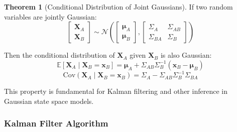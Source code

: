 \documentclass[12pt,a4paper]{article}
\theoremstyle{definition}
\newtheorem{theorem}{Theorem}[section]
\begin{document}
\begin{theorem}[Conditional Distribution of Joint Gaussians]
If two random variables are jointly Gaussian:
\[
\begin{bmatrix} \mathbf{X}_A \\ \mathbf{X}_B \end{bmatrix} \sim \mathcal{N}\left(\begin{bmatrix} \boldsymbol{\mu}_A \\ \boldsymbol{\mu}_B \end{bmatrix}, \begin{bmatrix} \Sigma_A & \Sigma_{AB} \\ \Sigma_{BA} & \Sigma_B \end{bmatrix}\right)
\]

Then the conditional distribution of $\mathbf{X}_A$ given $\mathbf{X}_B$ is also Gaussian:
\[
\mathbb{E}[\mathbf{X}_A \mid \mathbf{X}_B = \mathbf{x}_B] = \boldsymbol{\mu}_A + \Sigma_{AB} \Sigma_B^{-1} (\mathbf{x}_B - \boldsymbol{\mu}_B)
\]
\[
\text{Cov}(\mathbf{X}_A \mid \mathbf{X}_B = \mathbf{x}_B) = \Sigma_A - \Sigma_{AB} \Sigma_B^{-1} \Sigma_{BA}
\]

This property is fundamental for Kalman filtering and other inference in Gaussian state space models.
\end{theorem}

\subsubsection{Kalman Filter Algorithm}
\end{document}
